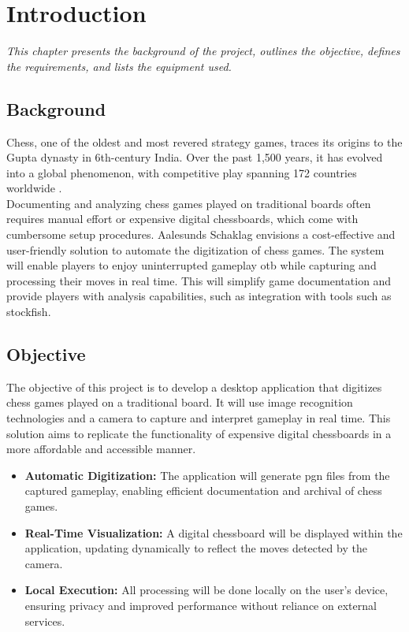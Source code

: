 \chapter{Introduction}

\begin{center} 
\textit{This chapter presents the background of the project, outlines the objective, defines the requirements, and lists the equipment used.}
\end{center}


\section{Background}

Chess, one of the oldest and most revered strategy games, traces its origins to the Gupta dynasty in 6th-century India. Over the past 1,500 years, it has evolved into a global phenomenon, with competitive play spanning 172 countries worldwide \cite{artsnculture}. \\

Documenting and analyzing chess games played on traditional boards often requires manual effort or expensive digital chessboards, which come with cumbersome setup procedures. Aalesunds Schaklag envisions a cost-effective and user-friendly solution to automate the digitization of chess games.  The system will enable players to enjoy uninterrupted gameplay \gls{otb} while capturing and processing their moves in real time. This will simplify game documentation and provide players with analysis capabilities, such as integration with tools such as \gls{stockfish}.

\newpage

\section{Objective}

The objective of this project is to develop a desktop application that digitizes chess games played on a traditional board. It will use image recognition technologies and a camera to capture and interpret gameplay in real time. This solution aims to replicate the functionality of expensive digital chessboards in a more affordable and accessible manner.

\begin{itemize}
    \item \textbf{Automatic Digitization:} The application will generate \gls{pgn} files from the captured gameplay, enabling efficient documentation and archival of chess games.

    \item \textbf{Real-Time Visualization:} A digital chessboard will be displayed within the application, updating dynamically to reflect the moves detected by the camera.

    \item \textbf{Local Execution:} All processing will be done locally on the user’s device, ensuring privacy and improved performance without reliance on external
    services.
\end{itemize}

